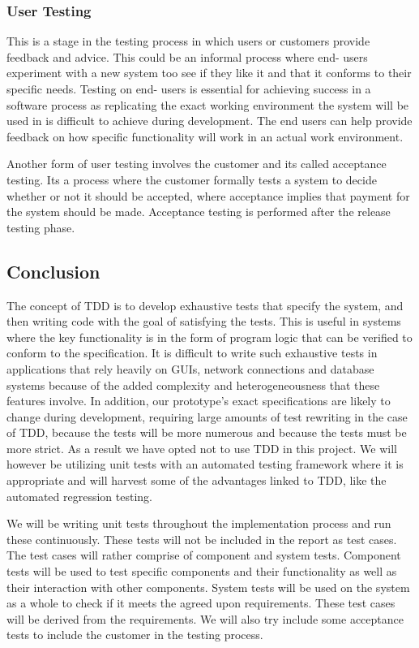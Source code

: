 \subsubsection{User Testing}
This is a stage in the testing process in which users or customers provide feedback and advice. This could be an informal process where end- users experiment with a new system too see if they like it and that it conforms to their specific needs. Testing on end- users is essential for achieving success in a software process as replicating the exact working environment the system will be used in is difficult to achieve during development. The end users can help provide feedback on how specific functionality will work in an actual work environment.

Another form of user testing involves the customer and its called acceptance testing. Its a process where the customer formally tests a system to decide whether or not it should be accepted, where acceptance implies that payment for the system should be made. Acceptance testing is performed after the release testing phase.

\subsection{Conclusion}
The concept of TDD is to develop exhaustive tests that specify the system, and then writing code with the goal of satisfying the tests. This is useful in systems where the key functionality is in the form of program logic that can be verified to conform to the specification. It is difficult to write such exhaustive tests in applications that rely heavily on GUIs, network connections and database systems because of the added complexity and heterogeneousness that these features involve. In addition, our prototype's exact specifications are likely to change during development, requiring large amounts of test rewriting in the case of TDD, because the tests will be more numerous and because the tests must be more strict. As a result we have opted not to use TDD in this project. We will however be utilizing unit tests with an automated testing framework where it is appropriate and will harvest some of the advantages linked to TDD, like the automated regression testing.

We will be writing unit tests throughout the implementation process and run these continuously. These tests will not be included in the report as test cases. The test cases will rather comprise of component and system tests. Component tests will be used to test specific components and their functionality as well as their interaction with other components. System tests will be used on the system as a whole to check if it meets the agreed upon requirements. These test cases will be derived from the requirements. We will also try include some acceptance tests to include the customer in the testing process. 

